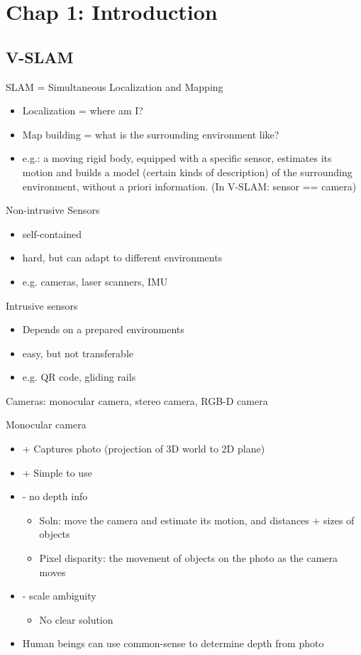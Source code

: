 \documentclass[main.tex]{subfiles}
\begin{document}
\newpage

\section{Chap 1: Introduction}

\subsection{V-SLAM}

SLAM = Simultaneous Localization and Mapping
\begin{itemize}
\item Localization = where am I?
\item Map building = what is the surrounding environment like?
\item e.g.: a moving rigid body, equipped with a specific sensor, estimates its motion and builds a model (certain kinds of description) of the surrounding environment, without a priori information. (In V-SLAM: sensor == camera)
\end{itemize}

Non-intrusive Sensors
\begin{itemize}
\item self-contained
\item hard, but can adapt to different environments
\item e.g. cameras, laser scanners, IMU
\end{itemize}

Intrusive sensors
\begin{itemize}
\item Depends on a prepared environments
\item easy, but not transferable
\item e.g. QR code, gliding rails
\end{itemize}

Cameras: monocular camera, stereo camera, RGB-D camera

Monocular camera
\begin{itemize}
\item + Captures photo (projection of 3D world to 2D plane)
\item + Simple to use
\item - no depth info
\begin{itemize}
	\item Soln: move the camera and estimate its motion, and distances + sizes of objects
	\item Pixel disparity: the movement of objects on the photo as the camera moves
\end{itemize}
\item - scale ambiguity
\begin{itemize}
	\item No clear solution
\end{itemize}
\item Human beings can use common-sense to determine depth from photo
\end{itemize}
\end{document}
